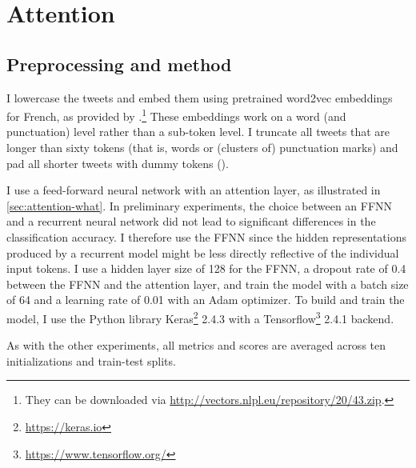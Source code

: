 \section{Attention}
\label{sec:tweets-method-attn}

\subsection{Preprocessing and method}

I lowercase the tweets and embed them using pretrained word2vec \citep{mikolov2013distributed} embeddings for French, as provided by \citet{fares2017word}.\footnote{%
They can be downloaded via \url{http://vectors.nlpl.eu/repository/20/43.zip}.}
These embeddings work on a word (and punctuation) level rather than a sub-token level.
I truncate all tweets that are longer than sixty tokens (that is, words or (clusters of) punctuation marks) and pad all shorter tweets with dummy tokens (\ngram\filler).


I use a feed-forward neural network with an attention layer, as illustrated in \autoref{sec:attention-what}.
In preliminary experiments, the choice between an FFNN and a recurrent neural network did not lead to significant differences in the classification accuracy.
I therefore use the FFNN since the hidden representations produced by a recurrent model might be less directly reflective of the individual input tokens.
I use a hidden layer size of 128 for the FFNN, a dropout rate of 0.4 between the FFNN and the attention layer, and train the model with a batch size of 64 and a learning rate of 0.01 with an Adam optimizer.
To build and train the model, I use the Python library Keras\footnote{\url{https://keras.io}} 2.4.3 with a Tensorflow\footnote{\url{https://www.tensorflow.org/}} 2.4.1 backend.

As with the other experiments, all metrics and scores are averaged across ten initializations and train-test splits.
